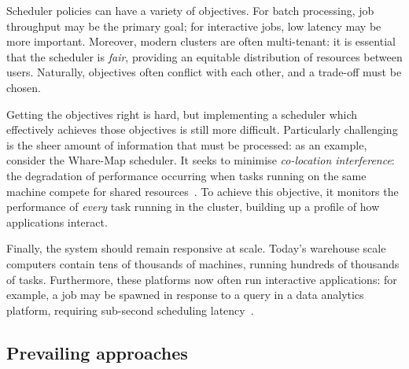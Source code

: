 Scheduler policies can have a variety of objectives. For batch processing, job throughput may be the primary goal; for interactive jobs, low latency may be more important. Moreover, modern clusters are often multi-tenant: it is essential that the scheduler is \emph{fair}, providing an equitable distribution of resources between users. Naturally, objectives often conflict with each other, and a trade-off must be chosen.

Getting the objectives right is hard, but implementing a scheduler which effectively achieves those objectives is still more difficult. Particularly challenging is the sheer amount of information that must be processed: as an example, consider the Whare-Map scheduler. It seeks to minimise \emph{co-location interference}: the degradation of performance occurring when tasks running on the same machine compete for shared resources~\cite{Mars:2013}\footnotemark. To achieve this objective, it monitors the performance of \emph{every} task running in the cluster, building up a profile of how applications interact.

Finally, the system should remain responsive at scale. Today's warehouse scale computers contain tens of thousands of machines, running hundreds of thousands of tasks. Furthermore, these platforms now often run interactive applications: for example, a job may be spawned in response to a query in a data analytics platform, requiring sub-second scheduling latency~\cite{Ousterhout:2013}.

\subsection{Prevailing approaches}

